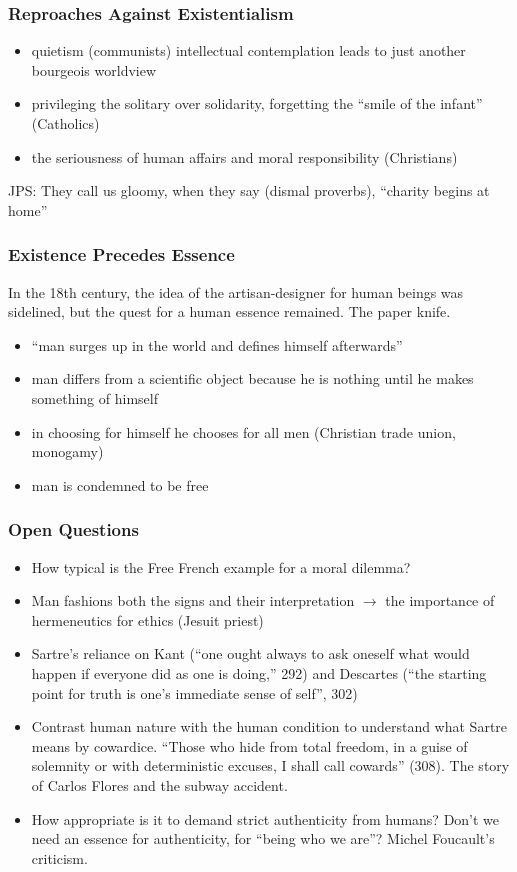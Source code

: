 \documentclass[xcolor=dvipsnames]{beamer}
\begin{document}
\begin{frame}
  \frametitle{Reproaches Against Existentialism}
  \begin{itemize}
  \item quietism (communists) intellectual contemplation leads to just
    another bourgeois worldview
  \item privileging the solitary over solidarity, forgetting the
    ``smile of the infant'' (Catholics)
  \item the seriousness of human affairs and moral responsibility (Christians)
  \end{itemize}
  JPS: They call us gloomy, when they say (dismal proverbs), ``charity
  begins at home''
\end{frame}

\begin{frame}
  \frametitle{Existence Precedes Essence}
  In the 18th century, the idea of the artisan-designer for human
  beings was sidelined, but the quest for a human essence remained.
  The paper knife.
  \begin{itemize}
  \item ``man surges up in the world and defines himself afterwards''
  \item man differs from a scientific object because he is nothing
    until he makes something of himself
  \item in choosing for himself he chooses for all men (Christian
    trade union, monogamy)
  \item man is condemned to be free
  \end{itemize}
\end{frame}

\begin{frame}
  \frametitle{Open Questions}
  \begin{itemize}
  \item How typical is the Free French example for a moral dilemma?
  \item Man fashions both the signs and their interpretation
    $\longrightarrow$ the importance of hermeneutics for ethics
    (Jesuit priest)
  \item Sartre's reliance on Kant (``one ought always to ask oneself
    what would happen if everyone did as one is doing,'' 292) and
    Descartes (``the starting point for truth is one's immediate sense
    of self'', 302)
  \item Contrast human nature with the human condition to understand
    what Sartre means by cowardice. ``Those who hide from total
    freedom, in a guise of solemnity or with deterministic excuses, I
    shall call cowards'' (308). The story of Carlos Flores and the
    subway accident.
  \item How appropriate is it to demand strict authenticity from
    humans? Don't we need an essence for authenticity, for ``being who
    we are''? Michel Foucault's criticism.
  \end{itemize}
\end{frame}
\end{document}
